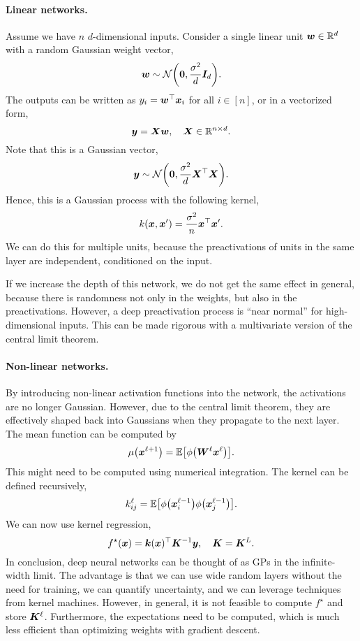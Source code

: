 \paragraph{Linear networks.}

Assume we have $n$ $d$-dimensional inputs. Consider a single linear unit $\bm{w} \in \mathbb{R}^d$ with a
random Gaussian weight vector, \[
    \vec{w} \sim \mathcal{N}\lft( \vec{0}, \frac{\sigma^2}{d} \mat{I}_d \rgt).
\]
The outputs can be written as $y_i = \bm{w}^\top \bm{x}_i$ for all $i \in [n]$, or in a
vectorized form, \[
    \bm{y} = \bm{X} \bm{w}, \quad \bm{X} \in \mathbb{R}^{n \times d}.
\]
Note that this is a Gaussian vector, \[
    \vec{y} \sim \mathcal{N}\lft( \vec{0}, \frac{\sigma^2}{d} \transpose{\mat{X}} \mat{X} \rgt).
\]
Hence, this is a Gaussian process with the following kernel, \[
    k(\bm{x}, \bm{x}') = \frac{\sigma^2}{n} \bm{x}^\top\bm{x}'.
\]
We can do this for multiple units, because the preactivations of units in the same layer are
independent, conditioned on the input.

If we increase the depth of this network, we do not get the same effect in general, because there
is randomness not only in the weights, but also in the preactivations. However, a deep
preactivation process is ``near normal'' for high-dimensional inputs. This can be made rigorous
with a multivariate version of the central limit theorem.

\paragraph{Non-linear networks.}

By introducing non-linear activation functions into the network, the activations are no longer
Gaussian. However, due to the central limit theorem, they are effectively shaped back into
Gaussians when they propagate to the next layer. The mean function can be computed by \[
    \mu \lft( \vec{x}^{\ell+1} \rgt) = \E \lft[ \phi \lft( \mat{W}^{\ell} \vec{x}^\ell \rgt) \rgt].
\]
This might need to be computed using numerical integration. The kernel can be defined recursively, \[
    k^{\ell}_{ij} = \E \lft[ \phi\lft( \vec{x}_{i}^{\ell-1} \rgt) \phi\lft( \vec{x}_j^{\ell-1} \rgt) \rgt].
\]
We can now use kernel regression, \[
    f^\star(\bm{x}) = \bm{k}(\bm{x})^\top \bm{K}^{-1} \bm{y}, \quad \bm{K} = \bm{K}^{L}.
\]
In conclusion, deep neural networks can be thought of as GPs in the infinite-width
limit.
The advantage is that we can use wide random layers without the need for training, we can quantify
uncertainty, and we can leverage techniques from kernel machines. However, in general, it is not
feasible to compute $f^\star$ and store $\bm{K}^{\ell}$. Furthermore, the expectations need to be
computed, which is much less efficient than optimizing weights with gradient descent.
